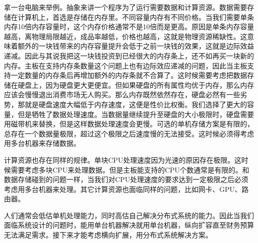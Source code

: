 拿一台电脑来举例。抽象来讲一个程序为了运行需要数据和计算资源。数据需要存储在计算机上，首选是存储在内存里。不同容量内存有不同价格。当我们需要单条内存10倍内存容量时，这个内存价格通常不是10倍而是更高。原因是单条内存容量越高，离物理局限越近，成品率越低，价格也越高，这就是物理资源稀缺性。这意味着额外的一块钱带来的内存容量提升会低于之前一块钱的效果，这就是边际效益递减。因此与其说我把这一块钱投资到已经很大的内存条上，还不如再买一块新的内存。主板在支持内存条数量这个问题上也有边际效应递减的问题，因此当主板支持一定数量的内存条后再增加额外的内存条就不合算了。这时候需要考虑把数据存储在硬盘上，因为硬盘更大更便宜。但如果硬盘的所有属性均优于内存，那么内存应该会慢慢退出消费市场无人购买。那么内存既然依然存在，硬盘必然有一些劣势，那就是硬盘速度大幅低于内存速度，这便是性价比权衡。我们选择了更大的容量，但是牺牲了数据处理速度。当数据量继续提升至硬盘的大小极限时，硬盘需要用磁带机来替换，但是这样数据处理速度会更慢。可选的单机存储方案是有限的，总存在一个数据量极限，超过这个极限之后速度慢的无法接受。这时候必须得考虑用多台机器来存储数据。

计算资源也存在同样的规律。单块CPU处理速度因为光速的原因存在极限。这时候需要考虑多块CPU来处理数据。但是主板能支持的CPU个数通常是有限的。和数据存储碰到的问题一样，当我们对CPU处理速度的要求达到一定极限之后必须考虑用多台机器来处理。其它计算资源也面临同样的问题，比如网卡、GPU、路由器。


人们通常会低估单机处理能力，同时高估自己解决分布式系统的能力。因此当我们面临系统设计的问题时，能用单台机器解决就用单台机器，纵向扩容直至财务预算无法满足需求。接下来才能考虑横向扩展，用分布式系统解决方案。

